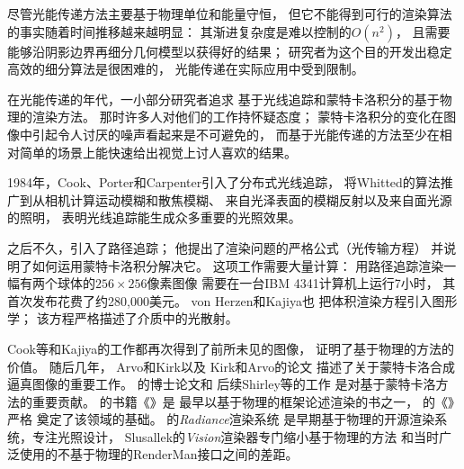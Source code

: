 尽管光能传递方法主要基于物理单位和能量守恒，
但它不能得到可行的渲染算法的事实随着时间推移越来越明显：
其渐进复杂度是难以控制的$O(n^2)$，
且需要能够沿阴影边界再细分几何模型以获得好的结果；
研究者为这个目的开发出稳定高效的细分算法是很困难的，
光能传递在实际应用中受到限制。

在光能传递的年代，一小部分研究者追求
基于光线追踪和蒙特卡洛积分的基于物理的渲染方法。
那时许多人对他们的工作持怀疑态度；
蒙特卡洛积分的变化在图像中引起令人讨厌的噪声看起来是不可避免的，
而基于光能传递的方法至少在相对简单的场景上能快速给出视觉上讨人喜欢的结果。

1984年，Cook、Porter和Carpenter\parencite*{10.1145/800031.808590}引入了分布式光线追踪，
将Whitted的算法推广到从相机计算运动模糊和散焦模糊、
来自光泽表面的模糊反射以及来自面光源的照明，
表明光线追踪能生成众多重要的光照效果。

之后不久，\citet{10.1145/15922.15902}引入了路径追踪；
他提出了渲染问题的严格公式（光传输方程）
并说明了如何运用蒙特卡洛积分解决它。
这项工作需要大量计算：
用路径追踪渲染一幅有两个球体的$256\times256$像素图像
需要在一台IBM 4341计算机上运行7小时，
其首次发布花费了约280,000美元\citep{farmer1981comparing}。
von Herzen和Kajiya\parencite*{10.1145/800031.808594}也
把体积渲染方程引入图形学；
该方程严格描述了介质中的光散射。

Cook等和Kajiya的工作都再次得到了前所未见的图像，
证明了基于物理的方法的价值。
随后几年， Arvo和Kirk\parencite*{10.1145/97879.97886}以及
Kirk和Arvo\parencite*{10.1145/122718.122735}的论文
描述了关于蒙特卡洛合成逼真图像的重要工作。
\citeauthor{10.5555/124947}的博士论文\parencite*{10.5555/124947}和
后续Shirley等\parencite*{10.1145/226150.226151}的工作
是对基于蒙特卡洛方法的重要贡献。
\citeauthor{10.5555/63450}的书籍《》\parencite*{10.5555/63450}是
最早以基于物理的框架论述渲染的书之一，
\citeauthor{10.5555/527570}的《》\parencite*{10.5555/527570}严格
奠定了该领域的基础。
\citeauthor{10.1145/192161.192286}的\emph{Radiance}渲染系统
是早期基于物理的开源渲染系统，专注光照设计\citep{10.1145/192161.192286}，
Slusallek的\emph{Vision}渲染器专门缩小基于物理的方法
和当时广泛使用的不基于物理的RenderMan接口之间的差距\citep{slusallek1996vision}。